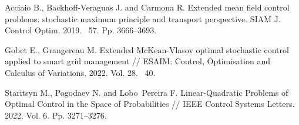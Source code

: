 \begin{thebibliography}{9} %

 Acciaio B., Backhoff-Veraguas J. and Carmona  R. Extended mean field control problems: stochastic maximum principle and transport perspective. SIAM J. Control Optim. 2019. \textnumero~57. Pp. 3666--3693.

 Gobet E., Grangereau M. Extended McKean-Vlasov optimal stochastic control applied
to smart grid management // ESAIM: Control, Optimisation and Calculus of Variations. 2022. Vol. 28. \textnumero~40.

 Staritsyn M., Pogodaev N. and Lobo~Pereira F. Linear-Quadratic Problems of Optimal Control in the Space of Probabilities // IEEE Control Systems Letters. 2022. Vol. 6. Pp. 3271--3276.






\end{thebibliography}





%

